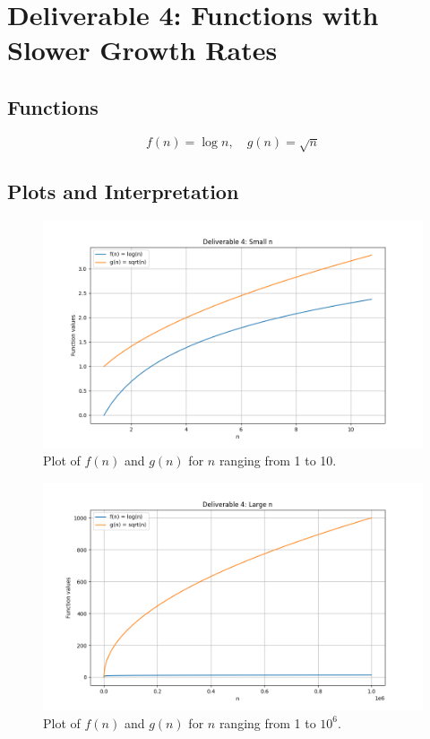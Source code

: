 \documentclass{article}
\begin{document}
\section{Deliverable 4: Functions with Slower Growth Rates}

\subsection{Functions}
\[
f(n) = \log n, \quad g(n) = \sqrt{n}
\]

\subsection{Plots and Interpretation}

\begin{figure}[H]
    \centering
    \includegraphics[width=\textwidth]{plot_deliverable4_smalln.png}
    \caption{Plot of $f(n)$ and $g(n)$ for $n$ ranging from 1 to 10.}
    \label{fig:fn3_gn3_2_10}
\end{figure}

\begin{figure}[H]
    \centering
    \includegraphics[width=\textwidth]{plot_deliverable4_largen.png}
    \caption{Plot of $f(n)$ and $g(n)$ for $n$ ranging from 1 to $10^6$.}
    \label{fig:fn3_gn3_2_10e6}
\end{figure}
\end{document}
